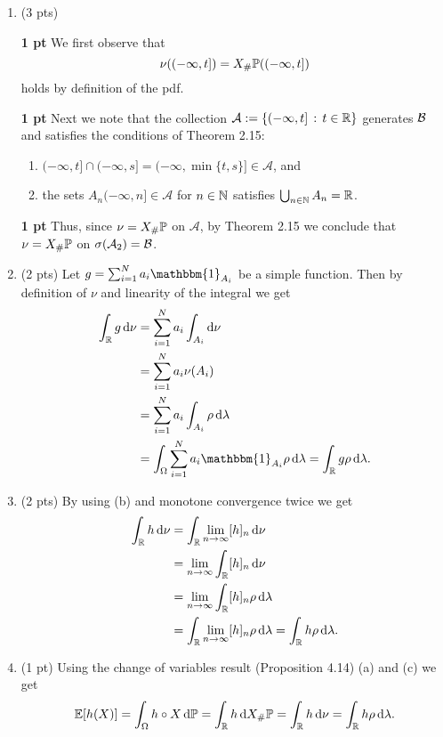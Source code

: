 \begin{enumerate}[label=(\alph*)]
\item (3 pts) 

\textbf{1 pt} We first observe that 
\[
	\nu((-\infty,t]) = X_\# \mathbb P((-\infty,t])
\]
holds by definition of the pdf. 

\textbf{1 pt}
Next we note that the collection $\mathcal{A} := \{(-\infty, t] \, : \, t \in \mathbb R\}$ generates $\mathcal B$ and satisfies the conditions of Theorem 2.15:
\begin{enumerate}
\item $(-\infty, t] \cap (-\infty ,s] = (-\infty, \min\{t,s\}] \in \mathcal{A}$, and
\item the sets $A_n (-\infty,n] \in \mathcal{A}$ for $n \in \mathbb N$ satisfies $\bigcup_{n \in \mathbb N} A_n = \mathbb R$.
\end{enumerate}

\textbf{1 pt}
Thus, since $\nu = X_\# \mathbb P$ on $\mathcal{A}$, by Theorem 2.15 we conclude that $\nu = X_\# \mathbb P$ on $\sigma(\mathcal A_2) = \mathcal B$.

\item (2 pts) Let $g = \sum_{i = 1}^N a_i \mathbbm{1}_{A_i}$ be a simple function. Then by definition of $\nu$ and linearity of the integral we get
\begin{align*}
	\int_\bbR g \, \dd \nu &= \sum_{i = 1}^N a_i \int_{A_i} \dd \nu\\
	&= \sum_{i = 1}^N a_i \nu(A_i) \\ 
	&= \sum_{i = 1}^N a_i \int_{A_i} \rho \, \dd \lambda \\
	&= \int_{\Omega} \sum_{i = 1}^N a_i \mathbbm{1}_{A_i} \rho \, \dd \lambda
	= \int_\bbR g \rho \, \dd \lambda.
\end{align*}
\item (2 pts) By using (b) and monotone convergence twice we get
\begin{align*}
	\int_{\mathbb R} h \, \mathrm{d} \nu &= \int_{\mathbb R} \lim_{n \to \infty} [h]_n \, \mathrm{d} \nu \\
	&= \lim_{n \to \infty} \int_{\mathbb R} [h]_n \, \mathrm{d} \nu \\
	&= \lim_{n \to \infty} \int_{\mathbb R} [h]_n \rho \, \mathrm{d} \lambda \\
	&= \int_{\mathbb R} \lim_{n \to \infty} [h]_n \rho \, \mathrm{d} \lambda = \int_{\mathbb R} h \rho \, \mathrm{d} \lambda.
\end{align*}
\item (1 pt) Using the change of variables result (Proposition 4.14) (a) and (c) we get
\[
	\mathbb E[h(X)] = \int_\Omega h \circ X \, \mathrm{d} \mathbb P 
	= \int_{\mathbb R} h \, \mathrm{d} X_\# \mathbb P = \int_{\mathbb R} h \, \mathrm{d} \nu 
	= \int_{\mathbb R} h \rho \, \mathrm{d} \lambda.
\]
\end{enumerate}

